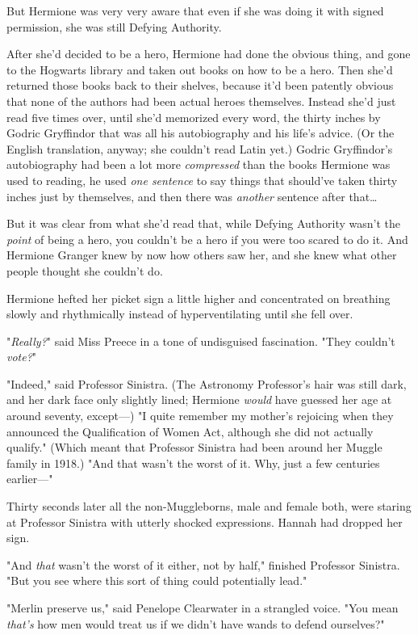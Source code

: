But Hermione was very very aware that even if she was doing it with signed permission, she was still Defying Authority.

After she'd decided to be a hero, Hermione had done the obvious thing, and gone to the Hogwarts library and taken out books on how to be a hero. Then she'd returned those books back to their shelves, because it'd been patently obvious that none of the authors had been actual heroes themselves. Instead she'd just read five times over, until she'd memorized every word, the thirty inches by Godric Gryffindor that was all his autobiography and his life's advice. (Or the English translation, anyway; she couldn't read Latin yet.) Godric Gryffindor's autobiography had been a lot more \emph{compressed} than the books Hermione was used to reading, he used \emph{one sentence} to say things that should've taken thirty inches just by themselves, and then there was \emph{another} sentence after that{\ldots}

But it was clear from what she'd read that, while Defying Authority wasn't the \emph{point} of being a hero, you couldn't be a hero if you were too scared to do it. And Hermione Granger knew by now how others saw her, and she knew what other people thought she couldn't do.

Hermione hefted her picket sign a little higher and concentrated on breathing slowly and rhythmically instead of hyperventilating until she fell over.

"\emph{Really?}" said Miss Preece in a tone of undisguised fascination. "They couldn't \emph{vote?}"

"Indeed," said Professor Sinistra. (The Astronomy Professor's hair was still dark, and her dark face only slightly lined; Hermione \emph{would} have guessed her age at around seventy, except---) "I quite remember my mother's rejoicing when they announced the Qualification of Women Act, although she did not actually qualify." (Which meant that Professor Sinistra had been around her Muggle family in 1918.) "And that wasn't the worst of it. Why, just a few centuries earlier---"

Thirty seconds later all the non-Muggleborns, male and female both, were staring at Professor Sinistra with utterly shocked expressions. Hannah had dropped her sign.

"And \emph{that} wasn't the worst of it either, not by half," finished Professor Sinistra. "But you see where this sort of thing could potentially lead."

"Merlin preserve us," said Penelope Clearwater in a strangled voice. "You mean \emph{that's} how men would treat us if we didn't have wands to defend ourselves?"

